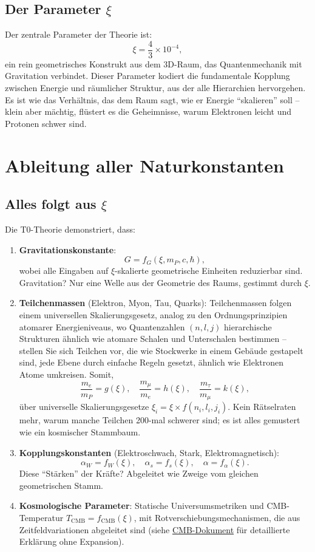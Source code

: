 	\subsection{Der Parameter $\xi$}
	Der zentrale Parameter der Theorie ist:
	\[
	\xi = \frac{4}{3} \times 10^{-4},
	\]
	ein rein geometrisches Konstrukt aus dem 3D-Raum, das Quantenmechanik mit Gravitation verbindet. Dieser Parameter kodiert die fundamentale Kopplung zwischen Energie und räumlicher Struktur, aus der alle Hierarchien hervorgehen. Es ist wie das Verhältnis, das dem Raum sagt, wie er Energie ``skalieren'' soll – klein aber mächtig, flüstert es die Geheimnisse, warum Elektronen leicht und Protonen schwer sind.
	
	\section{Ableitung aller Naturkonstanten}
	\subsection{Alles folgt aus $\xi$}
	Die T0-Theorie demonstriert, dass:
	\begin{enumerate}
		\item \textbf{Gravitationskonstante}:
		\[
		G = f_G(\xi, m_P, c, \hbar),
		\]
		wobei alle Eingaben auf $\xi$-skalierte geometrische Einheiten reduzierbar sind. Gravitation? Nur eine Welle aus der Geometrie des Raums, gestimmt durch $\xi$.
		
		\item \textbf{Teilchenmassen} (Elektron, Myon, Tau, Quarks):
		Teilchenmassen folgen einem universellen Skalierungsgesetz, analog zu den Ordnungsprinzipien atomarer Energieniveaus, wo Quantenzahlen $(n, l, j)$ hierarchische Strukturen ähnlich wie atomare Schalen und Unterschalen bestimmen – stellen Sie sich Teilchen vor, die wie Stockwerke in einem Gebäude gestapelt sind, jede Ebene durch einfache Regeln gesetzt, ähnlich wie Elektronen Atome umkreisen. Somit,
		\[
		\frac{m_e}{m_P} = g(\xi), \quad \frac{m_\mu}{m_e} = h(\xi), \quad \frac{m_\tau}{m_\mu} = k(\xi),
		\]
		über universelle Skalierungsgesetze $\xi_i = \xi \times f(n_i, l_i, j_i)$. Kein Rätselraten mehr, warum manche Teilchen 200-mal schwerer sind; es ist alles gemustert wie ein kosmischer Stammbaum.
		
		\item \textbf{Kopplungskonstanten} (Elektroschwach, Stark, Elektromagnetisch):
		\[
		\alpha_W = f_W(\xi), \quad \alpha_s = f_s(\xi), \quad \alpha = f_\alpha(\xi).
		\]
		Diese ``Stärken'' der Kräfte? Abgeleitet wie Zweige vom gleichen geometrischen Stamm.
		
		\item \textbf{Kosmologische Parameter}:
		Statische Universumsmetriken und CMB-Temperatur $T_{\text{CMB}} = f_{\text{CMB}}(\xi)$, mit Rotverschiebungsmechanismen, die aus Zeitfeldvariationen abgeleitet sind (siehe \href{https://github.com/jpascher/T0-Time-Mass-Duality/blob/main/2/pdf/140_T0_CMB_Donoghue_Analyse_En.pdf}{CMB-Dokument} für detaillierte Erklärung ohne Expansion).
	\end{enumerate}
	

